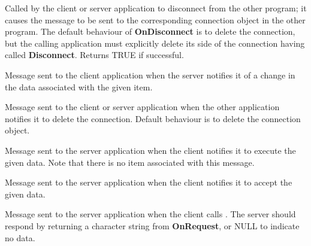 
Called by the client or server application to disconnect from the other
program; it causes the  message
to be sent to the corresponding connection object in the other
program. The default behaviour of {\bf OnDisconnect} is to delete the
connection, but the calling application must explicitly delete its
side of the connection having called {\bf Disconnect}. Returns TRUE if
successful.

\label{wxconnectiononadvise}


Message sent to the client application when the server notifies it of a
change in the data associated with the given item.

\label{wxconnectionondisconnect}


Message sent to the client or server application when the other
application notifies it to delete the connection. Default behaviour is
to delete the connection object.

\label{wxconnectiononexecute}


Message sent to the server application when the client notifies it to
execute the given data. Note that there is no item associated with
this message.

\label{wxconnectiononpoke}


Message sent to the server application when the client notifies it to
accept the given data.

\label{wxconnectiononrequest}


Message sent to the server application when the client
calls . The server
should respond by returning a character string from {\bf OnRequest},
or NULL to indicate no data.

